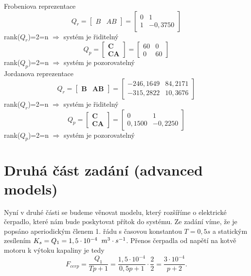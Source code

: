 \documentclass{article}
\begin{document}
			Frobeniova reprezentace
				\[Q_{r}=\begin{bmatrix}
					B&AB
				\end{bmatrix}=\begin{bmatrix}
					0&1\\
					1&-0,3750
				\end{bmatrix}\]\hspace{11cm}rank(\(Q_{r}\))=2=n $\Rightarrow$ systém je řiditelný
				\[Q_{p}=\begin{bmatrix}
					\textbf{C}\\ \textbf{CA}
				\end{bmatrix}=\begin{bmatrix}
					60&0\\
					0&60
				\end{bmatrix}\]\hspace{11cm}rank(\(Q_{p}\))=2=n $\Rightarrow$ systém je pozorovatelný\\
			Jordanova reprezentace
				\[Q_{r}=\begin{bmatrix}
					\textbf{B}& \textbf{AB}
				\end{bmatrix}=\begin{bmatrix}
					-246,1649&84,2171\\
					-315,2822&10,3676
				\end{bmatrix}\]\hspace{11cm}rank(\(Q_{r}\))=2=n $\Rightarrow$ systém je řiditelný
				\[Q_{p}=\begin{bmatrix}
					\textbf{C}\\ \textbf{CA}
				\end{bmatrix}=\begin{bmatrix}
					0&1\\
					0,1500&-0,2250
				\end{bmatrix}\]\hspace{11cm}rank(\(Q_{p}\))=2=n $\Rightarrow$ systém je pozorovatelný\\
	\newpage
	\section{Druhá část zadání (advanced models)}
		Nyní v druhé části se budeme věnovat modelu, který rozšíříme o elektrické čerpadlo, které nám bude poskytovat přítok do systému. Ze zadání víme, že je popsáno aperiodickým členem 1. řádu s časovou konstantou \(T=0,5s\) a statickým zesílením \(K_{s}=Q_{1}=1,5\cdot10^{-4} \hspace{2mm} m^{3}\cdot s^{-1}\). Přenos čerpadla od napětí na kotvě motoru k výtoku kapaliny je tedy
		\[F_{cerp}=\frac{Q_{1}}{Tp +1}=\frac{1,5\cdot10^{-4}}{0,5 p+1}\cdot\frac{2}{2}=\frac{3\cdot10^{-4}}{p+2}.\]
\end{document}
